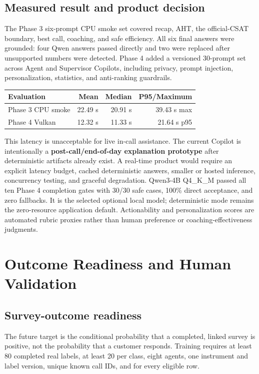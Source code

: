 \documentclass[11pt,letterpaper]{article}
\begin{document}
\subsection{Measured result and product decision}

The Phase 3 six-prompt CPU smoke set covered recap, AHT, the official-CSAT boundary,
best call, coaching, and safe efficiency. All six final answers were grounded: four
Qwen answers passed directly and two were replaced after unsupported numbers were
detected. Phase 4 added a versioned 30-prompt set across Agent and Supervisor
Copilots, including privacy, prompt injection, personalization, statistics, and
anti-ranking guardrails.

\begin{center}\small
\begin{tabular}{lrrr}
\toprule
Evaluation & Mean & Median & P95/Maximum \\
\midrule
Phase 3 CPU smoke & 22.49 s & 20.91 s & 39.43 s max \\
Phase 4 Vulkan & 12.32 s & 11.33 s & 21.64 s p95 \\
\bottomrule
\end{tabular}
\end{center}

This latency is unacceptable for live in-call assistance. The current Copilot is
intentionally a \textbf{post-call/end-of-day explanation prototype} after deterministic
artifacts already exist. A real-time product would require an explicit latency budget,
cached deterministic answers, smaller or hosted inference, concurrency testing, and
graceful degradation. Qwen3-4B Q4\_K\_M passed all ten Phase 4 completion gates with
30/30 safe cases, 100\% direct acceptance, and zero fallbacks. It is the selected
optional local model; deterministic mode remains the zero-resource application
default. Actionability and personalization scores are automated rubric proxies rather
than human preference or coaching-effectiveness judgments.

\clearpage
\section{Outcome Readiness and Human Validation}

\subsection{Survey-outcome readiness}

The future target is the conditional probability that a completed, linked survey is
positive, not the probability that a customer responds. Training requires at least 80
completed real labels, at least 20 per class, eight agents, one instrument and label
version, unique known call IDs, and  for every eligible row.
\end{document}
